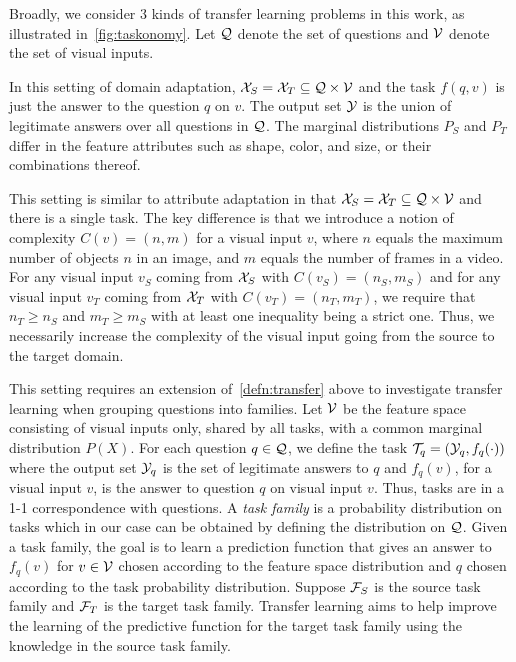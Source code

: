 Broadly, we consider 3 kinds of transfer learning problems in this work, as illustrated in~\cref{fig:taskonomy}. 
Let $\mathcal{Q}$ denote the set of questions and $\mathcal{V}$ denote the set of visual inputs.
\begin{description}
	\compresslist %
	\item[Feature Transfer:] In this setting of domain adaptation, $\mathcal{X}_S = \mathcal{X}_T \subseteq \mathcal{Q} \times \mathcal{V}$
	and the task $f(q,v)$ is just the answer to the question $q$ on $v$. The output set $\mathcal{Y}$ is the union of legitimate answers
	over all questions in $\mathcal{Q}$.
	The marginal distributions $P_S$ and $P_T$ differ in the feature attributes such as shape, color, and size, or their combinations
	thereof.
	
	\item[Temporal Transfer:] This setting is similar to attribute adaptation in that $\mathcal{X}_S = \mathcal{X}_T \subseteq \mathcal{Q} \times \mathcal{V}$
	and there is a single task.
	The key difference is that we introduce a notion of complexity $C(v) = (n, m)$ for a visual input $v$,
	where $n$ equals the maximum number of objects $n$ in an image, and $m$
	equals  the number of frames in a video. 
	For any visual input $v_S$ coming from $\mathcal{X}_S$ with $C(v_S) = (n_S, m_S)$
	and for any visual input $v_T$ coming from $\mathcal{X}_T$ with $C(v_T) = (n_T, m_T)$, we require that $n_T \ge n_S$ and 
	$m_T \ge m_S$ with at least one inequality being a strict one. 
	Thus, we necessarily increase the complexity of the visual input going from the source to the target domain.
	
	\item[Reasoning Transfer:]
	This setting requires an extension of~\cref{defn:transfer} above to investigate transfer learning when
	grouping questions into families. Let $\mathcal{V}$ be the feature space consisting of visual inputs only, shared by
	all tasks, with a common marginal distribution $P(X)$. For each question $q \in \mathcal{Q}$, we define the task 
	$\mathcal{T}_q = (\mathcal{Y}_q, f_q(\cdot))$ where
	the output set $\mathcal{Y}_q$ is the set of legitimate answers to $q$ and $f_q(v)$, for a visual input $v$, 
	is the answer to question $q$ on visual input $v$.
	Thus, tasks are in a 1-1 correspondence with questions.
	A \emph{task family} is a probability distribution on tasks which in our case can be obtained by defining the distribution on $\mathcal{Q}$. 
	Given a task family, the goal is to learn a prediction function that gives an answer to $f_q(v)$ for $v \in \mathcal{V}$ chosen according 
	to the feature space distribution and $q$ chosen according to the task probability distribution.
	Suppose $\mathcal{F}_S$ is the source task family and $\mathcal{F}_T$ is the target task family.
	Transfer learning aims to help improve the learning of the predictive function for the target task family 
	using the knowledge in the source task family.
	
\end{description}

